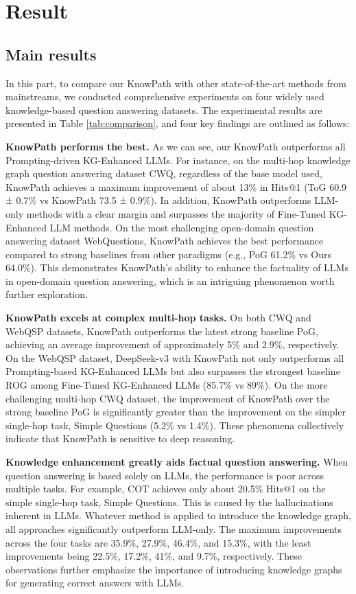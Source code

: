 \section{Result}

\subsection{Main results}

In this part, to compare our KnowPath with other state-of-the-art methods from mainstreams, we conducted comprehensive experiments on four widely used knowledge-based question answering datasets. The experimental results are presented in Table \ref{tab:comparison}, and four key findings are outlined as follows:

\textbf{KnowPath performs the best.}
As we can see, our KnowPath outperforms all Prompting-driven KG-Enhanced LLMs.
For instance, on the multi-hop knowledge graph question answering dataset CWQ, regardless of the base model used, KnowPath achieves a maximum improvement of about 13\% in Hits@1 (ToG 60.9 ± 0.7\% vs KnowPath 73.5 ± 0.9\%).
In addition, KnowPath outperforms LLM-only methods with a clear margin and surpasses the majority of Fine-Tuned KG-Enhanced LLM methods.
On the most challenging open-domain question answering dataset WebQuestions, KnowPath achieves the best performance compared to strong baselines from other paradigms (e.g., PoG 61.2\% vs Ours 64.0\%). This demonstrates KnowPath's ability to enhance the factuality of LLMs in open-domain question answering, which is an intriguing phenomenon worth further exploration.

\textbf{KnowPath excels at complex multi-hop tasks.}
On both CWQ and WebQSP datasets, KnowPath outperforms the latest strong baseline PoG, achieving an average improvement of approximately 5\% and 2.9\%, respectively.
On the WebQSP dataset, DeepSeek-v3 with KnowPath not only outperforms all Prompting-based KG-Enhanced LLMs but also surpasses the strongest baseline ROG among Fine-Tuned KG-Enhanced LLMs (85.7\% vs 89\%). 
On the more challenging multi-hop CWQ dataset, the improvement of KnowPath over the strong baseline PoG is significantly greater than the improvement on the simpler single-hop task, Simple Questions (5.2\% vs 1.4\%).
These phenomena collectively indicate that KnowPath is sensitive to deep reasoning.

\textbf{Knowledge enhancement greatly aids factual question answering.}
When question answering is based solely on LLMs, the performance is poor across multiple tasks. For example, COT achieves only about 20.5\% Hits@1 on the simple single-hop task, Simple Questions.
This is caused by the hallucinations inherent in LLMs.
Whatever method is applied to introduce the knowledge graph, all approaches significantly outperform LLM-only. The maximum improvements across the four tasks are 35.9\%, 27.9\%, 46.4\%, and 15.3\%, with the least improvements being 22.5\%, 17.2\%, 41\%, and 9.7\%, respectively.
These observations further emphasize the importance of introducing knowledge graphs for generating correct answers with LLMs.


